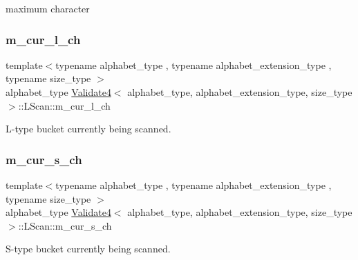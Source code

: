 maximum character 

\mbox{\label{struct_validate4_1_1_l_scan_abf7d8f90883c943c08a007425c43c644}} 
\subsubsection{\texorpdfstring{m\+\_\+cur\+\_\+l\+\_\+ch}{m\_cur\_l\_ch}}
{\footnotesize\ttfamily template$<$typename alphabet\+\_\+type , typename alphabet\+\_\+extension\+\_\+type , typename size\+\_\+type $>$ \\
alphabet\+\_\+type \hyperlink{class_validate4}{Validate4}$<$ alphabet\+\_\+type, alphabet\+\_\+extension\+\_\+type, size\+\_\+type $>$\+::L\+Scan\+::m\+\_\+cur\+\_\+l\+\_\+ch\hspace{0.3cm}{\ttfamily [private]}}



L-\/type bucket currently being scanned. 

\mbox{\label{struct_validate4_1_1_l_scan_ac765bc6e6817fbe71a7aacbd4e2811d9}} 
\subsubsection{\texorpdfstring{m\+\_\+cur\+\_\+s\+\_\+ch}{m\_cur\_s\_ch}}
{\footnotesize\ttfamily template$<$typename alphabet\+\_\+type , typename alphabet\+\_\+extension\+\_\+type , typename size\+\_\+type $>$ \\
alphabet\+\_\+type \hyperlink{class_validate4}{Validate4}$<$ alphabet\+\_\+type, alphabet\+\_\+extension\+\_\+type, size\+\_\+type $>$\+::L\+Scan\+::m\+\_\+cur\+\_\+s\+\_\+ch\hspace{0.3cm}{\ttfamily [private]}}



S-\/type bucket currently being scanned. 

\mbox{\label{struct_validate4_1_1_l_scan_a41c937ae175b97c22325458bcafeeb7e}} 

